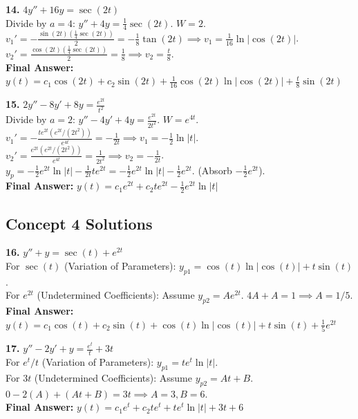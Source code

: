 \documentclass[11pt]{article}
\begin{document}
\vspace{0.5cm}
\textbf{14.} $4y'' + 16y = \sec(2t)$ \\
Divide by $a=4$: $y'' + 4y = \frac{1}{4}\sec(2t)$. $W = 2$. \\
$v_1' = -\frac{\sin(2t)(\frac{1}{4}\sec(2t))}{2} = -\frac{1}{8}\tan(2t) \implies v_1 = \frac{1}{16}\ln|\cos(2t)|$. \\
$v_2' = \frac{\cos(2t)(\frac{1}{4}\sec(2t))}{2} = \frac{1}{8} \implies v_2 = \frac{t}{8}$. \\
\textbf{Final Answer:} $y(t) = c_1\cos(2t) + c_2\sin(2t) + \frac{1}{16}\cos(2t)\ln|\cos(2t)| + \frac{t}{8}\sin(2t)$

\vspace{0.5cm}
\textbf{15.} $2y'' - 8y' + 8y = \frac{e^{2t}}{t^2}$ \\
Divide by $a=2$: $y'' - 4y' + 4y = \frac{e^{2t}}{2t^2}$. $W = e^{4t}$. \\
$v_1' = -\frac{te^{2t}(e^{2t}/(2t^2))}{e^{4t}} = -\frac{1}{2t} \implies v_1 = -\frac{1}{2}\ln|t|$. \\
$v_2' = \frac{e^{2t}(e^{2t}/(2t^2))}{e^{4t}} = \frac{1}{2t^2} \implies v_2 = -\frac{1}{2t}$. \\
$y_p = -\frac{1}{2}e^{2t}\ln|t| - \frac{1}{2t}te^{2t} = -\frac{1}{2}e^{2t}\ln|t| - \frac{1}{2}e^{2t}$. (Absorb $-\frac{1}{2}e^{2t}$). \\
\textbf{Final Answer:} $y(t) = c_1e^{2t} + c_2te^{2t} - \frac{1}{2}e^{2t}\ln|t|$

\subsection*{Concept 4 Solutions}
\textbf{16.} $y'' + y = \sec(t) + e^{2t}$ \\
For $\sec(t)$ (Variation of Parameters): $y_{p1} = \cos(t)\ln|\cos(t)| + t\sin(t)$. \\
For $e^{2t}$ (Undetermined Coefficients): Assume $y_{p2} = Ae^{2t}$. $4A + A = 1 \implies A = 1/5$. \\
\textbf{Final Answer:} $y(t) = c_1\cos(t) + c_2\sin(t) + \cos(t)\ln|\cos(t)| + t\sin(t) + \frac{1}{5}e^{2t}$

\vspace{0.5cm}
\textbf{17.} $y'' - 2y' + y = \frac{e^t}{t} + 3t$ \\
For $e^t/t$ (Variation of Parameters): $y_{p1} = te^t\ln|t|$. \\
For $3t$ (Undetermined Coefficients): Assume $y_{p2} = At + B$. $0 - 2(A) + (At+B) = 3t \implies A=3, B=6$. \\
\textbf{Final Answer:} $y(t) = c_1e^t + c_2te^t + te^t\ln|t| + 3t + 6$
\end{document}
